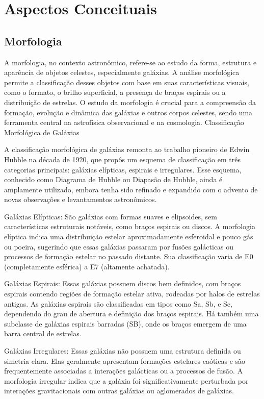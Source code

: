 \chapter{Aspectos Conceituais}
\label{cap:conceitos}

\section{Morfologia}

A morfologia, no contexto astronômico, refere-se ao estudo da forma, estrutura e aparência de objetos celestes, especialmente galáxias. A análise morfológica permite a classificação desses objetos com base em suas características visuais, como o formato, o brilho superficial, a presença de braços espirais ou a distribuição de estrelas. O estudo da morfologia é crucial para a compreensão da formação, evolução e dinâmica das galáxias e outros corpos celestes, sendo uma ferramenta central na astrofísica observacional e na cosmologia.
Classificação Morfológica de Galáxias

A classificação morfológica de galáxias remonta ao trabalho pioneiro de Edwin Hubble na década de 1920, que propôs um esquema de classificação em três categorias principais: galáxias elípticas, espirais e irregulares. Esse esquema, conhecido como Diagrama de Hubble ou Diapasão de Hubble, ainda é amplamente utilizado, embora tenha sido refinado e expandido com o advento de novas observações e levantamentos astronômicos.

Galáxias Elípticas: São galáxias com formas suaves e elipsoides, sem características estruturais notáveis, como braços espirais ou discos. A morfologia elíptica indica uma distribuição estelar aproximadamente esferoidal e pouco gás ou poeira, sugerindo que essas galáxias passaram por fusões galácticas ou processos de formação estelar no passado distante. Sua classificação varia de E0 (completamente esférica) a E7 (altamente achatada).

Galáxias Espirais: Essas galáxias possuem discos bem definidos, com braços espirais contendo regiões de formação estelar ativa, rodeadas por halos de estrelas antigas. As galáxias espirais são classificadas em tipos como Sa, Sb, e Sc, dependendo do grau de abertura e definição dos braços espirais. Há também uma subclasse de galáxias espirais barradas (SB), onde os braços emergem de uma barra central de estrelas.

Galáxias Irregulares: Essas galáxias não possuem uma estrutura definida ou simetria clara. Elas geralmente apresentam formações estelares caóticas e são frequentemente associadas a interações galácticas ou a processos de fusão. A morfologia irregular indica que a galáxia foi significativamente perturbada por interações gravitacionais com outras galáxias ou aglomerados de galáxias.

